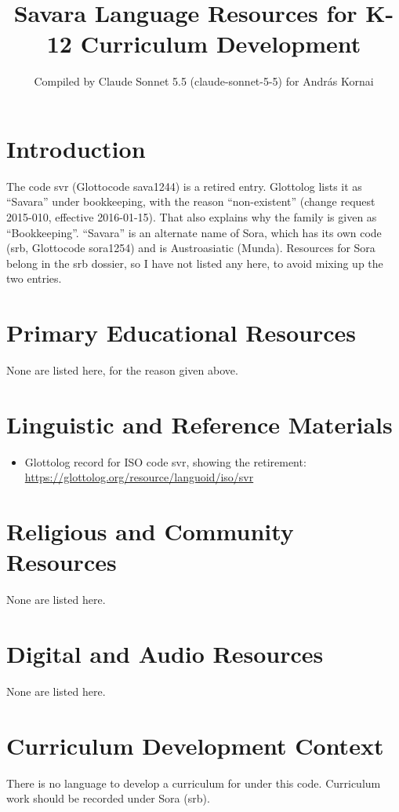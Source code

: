 \documentclass[12pt]{article}
\title{Savara Language Resources for K-12 Curriculum Development}
\author{Compiled by Claude Sonnet 5.5 (claude-sonnet-5-5) for Andr\'as Kornai}
\date{}
\begin{document}
\maketitle

\section{Introduction}
The code svr (Glottocode sava1244) is a retired entry. Glottolog lists it as ``Savara'' under bookkeeping, with the reason ``non-existent'' (change request 2015-010, effective 2016-01-15). That also explains why the family is given as ``Bookkeeping''. ``Savara'' is an alternate name of Sora, which has its own code (srb, Glottocode sora1254) and is Austroasiatic (Munda). Resources for Sora belong in the srb dossier, so I have not listed any here, to avoid mixing up the two entries.

\section{Primary Educational Resources}
None are listed here, for the reason given above.

\section{Linguistic and Reference Materials}
\begin{itemize}
\item Glottolog record for ISO code svr, showing the retirement: \url{https://glottolog.org/resource/languoid/iso/svr}
\end{itemize}

\section{Religious and Community Resources}
None are listed here.

\section{Digital and Audio Resources}
None are listed here.

\section{Curriculum Development Context}
There is no language to develop a curriculum for under this code. Curriculum work should be recorded under Sora (srb).
\end{document}
